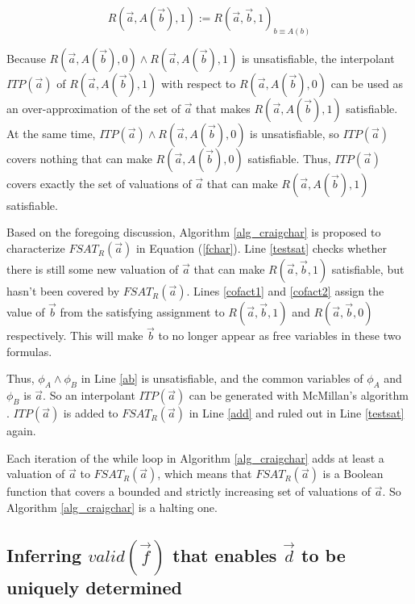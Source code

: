 \documentclass[runningheads,a4paper,orivec]{llncs}
\begin{document}
\begin{equation}
R(\vec{a},A(\vec{b}),1):=R(\vec{a},\vec{b},1)_{b\equiv A(b)}
\end{equation}

Because $R(\vec{a},A(\vec{b}),0)\wedge R(\vec{a},A(\vec{b}),1)$ is unsatisfiable,
the interpolant $ITP(\vec{a})$ of $R(\vec{a},A(\vec{b}),1)$ with respect to $R(\vec{a},A(\vec{b}),0)$ can be  
used as an over-approximation of the set of $\vec{a}$ that makes $R(\vec{a},A(\vec{b}),1)$ satisfiable.
At the same time,
$ITP(\vec{a})\wedge R(\vec{a},A(\vec{b}),0)$ is unsatisfiable,
so $ITP(\vec{a})$ covers nothing that can make $R(\vec{a},A(\vec{b}),0)$ satisfiable.
Thus,
$ITP(\vec{a})$ covers exactly the set of valuations of $\vec{a}$ that can make $R(\vec{a},A(\vec{b}),1)$ satisfiable.


Based on the foregoing discussion,
Algorithm \ref{alg_craigchar} is proposed to characterize $FSAT_R(\vec{a})$ in Equation (\ref{fchar}).
Line \ref{testsat} checks whether there is still some new valuation of $\vec{a}$ that can make $R(\vec{a},\vec{b},1)$ satisfiable,
but hasn't been covered by $FSAT_R(\vec{a})$.
Lines \ref{cofact1} and \ref{cofact2} assign the value of $\vec{b}$ 
from the satisfying assignment to $R(\vec{a},\vec{b},1)$ and $R(\vec{a},\vec{b},0)$ respectively.
This will make $\vec{b}$ to no longer appear as free variables in these two formulas.

Thus,
$\phi_A\wedge \phi_B$ in Line \ref{ab} is unsatisfiable,
and the common variables of $\phi_A$ and $\phi_B$ is $\vec{a}$.
So an interpolant $ITP(\vec{a})$ can be generated with McMillan's algorithm \cite{interp_McMillan}.
$ITP(\vec{a})$ is added to $FSAT_R(\vec{a})$ in Line \ref{add} and ruled out in Line \ref{testsat} again.

Each iteration of the while loop in Algorithm \ref{alg_craigchar} adds at least a valuation of $\vec{a}$ to $FSAT_R(\vec{a})$,
which means that $FSAT_R(\vec{a})$ is a Boolean function that covers a bounded and strictly increasing set of valuations of $\vec{a}$.
So Algorithm \ref{alg_craigchar} is a halting one.

\subsection{Inferring $valid(\vec{f})$ that enables $\vec{d}$ to be uniquely determined}\label{subsec_infer}
\end{document}

